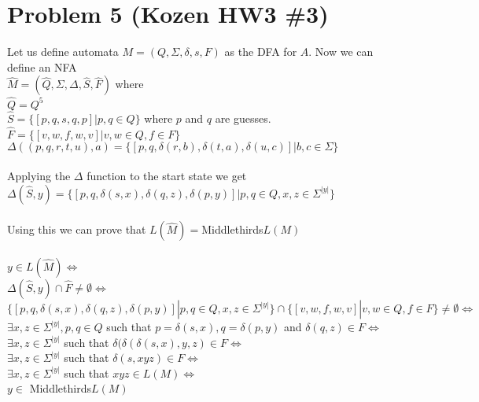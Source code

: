 \documentclass[11pt, a4paper, oneside]{article}
\begin{document}
\section*{Problem 5 (Kozen HW3 \#3)}
Let us define automata $M=(Q, \Sigma, \delta, s, F)$ as the DFA for $A$.
Now we can define an NFA\\
$\hat{M} = (\hat{Q}, \Sigma, \Delta, \hat{S}, \hat{F})$ where\\
$\hat{Q} = Q^5$\\
$\hat{S} = \{[p,q,s,q,p] | p,q \in Q\}$ where $p$ and $q$ are guesses.\\
$\hat{F} = \{[v,w,f,w,v] | v,w \in Q, f \in F\}$\\
$\Delta((p,q,r,t,u),a) = \{[p,q,\delta(r,b), \delta(t,a), 
                           \delta(u,c)] | b,c \in \Sigma\}$\\
\\
Applying the $\Delta$ function to the start state we get\\
$\Delta(\hat{S}, y) = \{[p,q,\delta(s,x), \delta(q,z), \delta(p,y)] | 
                         p,q \in Q, x,z \in \Sigma^{|y|}\}$\\
\\
Using this we can prove that $L(\hat{M}) = $Middlethirds$L(M)$\\
\\
$y \in L(\hat{M}) \Leftrightarrow$\\
$\Delta(\hat{S}, y) \cap \hat{F} \neq \emptyset \Leftrightarrow$\\
$\{[p,q,\delta(s,x), \delta(q,z), \delta(p,y)] | p,q \in Q, x,z 
   \in \Sigma^{|y|}\} \cap \{[v,w,f,w,v] | v,w \in Q, f \in F\} 
   \neq \emptyset \Leftrightarrow$\\
$\exists x,z \in \Sigma^{|y|}, p,q \in Q$ such that $p = \delta(s,x), 
   q = \delta(p,y)$ and $\delta(q,z) \in F \Leftrightarrow$\\
$\exists x,z \in \Sigma^{|y|}$ such that $\delta(\delta(\delta(s,x),y,z)
   \in F \Leftrightarrow$\\
$\exists x,z \in \Sigma^{|y|}$ such that $\delta(s,xyz) \in F 
   \Leftrightarrow$\\
$\exists x,z \in \Sigma^{|y|}$ such that $xyz \in L(M) \Leftrightarrow$\\
$y \in$ Middlethirds$L(M)$
\end{document}
